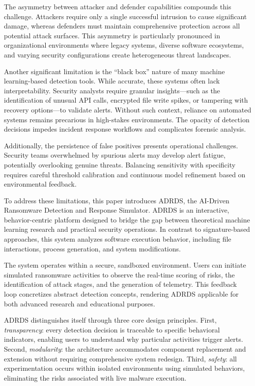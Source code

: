 The asymmetry between attacker and defender capabilities compounds this challenge. Attackers require only a single successful intrusion to cause significant damage, whereas defenders must maintain comprehensive protection across all potential attack surfaces. This asymmetry is particularly pronounced in organizational environments where legacy systems, diverse software ecosystems, and varying security configurations create heterogeneous threat landscapes.

Another significant limitation is the ``black box'' nature of many machine learning-based detection tools. While accurate, these systems often lack interpretability. Security analysts require granular insights—such as the identification of unusual API calls, encrypted file write spikes, or tampering with recovery options—to validate alerts. Without such context, reliance on automated systems remains precarious in high-stakes environments. The opacity of detection decisions impedes incident response workflows and complicates forensic analysis.

Additionally, the persistence of false positives presents operational challenges. Security teams overwhelmed by spurious alerts may develop alert fatigue, potentially overlooking genuine threats. Balancing sensitivity with specificity requires careful threshold calibration and continuous model refinement based on environmental feedback.


To address these limitations, this paper introduces ADRDS, the AI-Driven Ransomware Detection and Response Simulator. ADRDS is an interactive, behavior-centric platform designed to bridge the gap between theoretical machine learning research and practical security operations. In contrast to signature-based approaches, this system analyzes software execution behavior, including file interactions, process generation, and system modifications.

The system operates within a secure, sandboxed environment. Users can initiate simulated ransomware activities to observe the real-time scoring of risks, the identification of attack stages, and the generation of telemetry. This feedback loop concretizes abstract detection concepts, rendering ADRDS applicable for both advanced research and educational purposes.

ADRDS distinguishes itself through three core design principles. First, \emph{transparency}: every detection decision is traceable to specific behavioral indicators, enabling users to understand why particular activities trigger alerts. Second, \emph{modularity}: the architecture accommodates component replacement and extension without requiring comprehensive system redesign. Third, \emph{safety}: all experimentation occurs within isolated environments using simulated behaviors, eliminating the risks associated with live malware execution.

